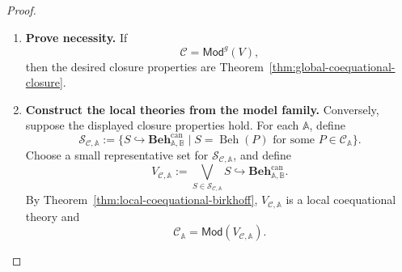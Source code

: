 \begin{proof}
    \leavevmode
    \begin{enumerate}
        \item \textbf{Prove necessity.}
        If
        \[
            \mathcal C=\mathsf{Mod}^{g}(V),
        \]
        then the desired closure properties are
        Theorem~\ref{thm:global-coequational-closure}.

        \item \textbf{Construct the local theories from the model family.}
        Conversely, suppose the displayed closure properties hold. For each
        \(\mathbb A\), define
        \[
            \mathcal S_{\mathcal C,\mathbb A}
            :=
            \{
                S\hookrightarrow
                \mathbf{Beh}^{\mathrm{can}}_{\mathbb A,\mathbb B}
                \mid
                S=\operatorname{Beh}(P)
                \text{ for some }P\in\mathcal C_{\mathbb A}
            \}.
        \]
        Choose a small representative set for
        \(\mathcal S_{\mathcal C,\mathbb A}\), and define
        \[
            V_{\mathcal C,\mathbb A}
            :=
            \bigvee_{S\in\mathcal S_{\mathcal C,\mathbb A}}
            S
            \hookrightarrow
            \mathbf{Beh}^{\mathrm{can}}_{\mathbb A,\mathbb B}.
        \]
        By Theorem~\ref{thm:local-coequational-birkhoff},
        \(V_{\mathcal C,\mathbb A}\) is a local coequational theory and
        \[
            \mathcal C_{\mathbb A}
            =
            \mathsf{Mod}(V_{\mathcal C,\mathbb A}).
        \]


\end{enumerate}
\end{proof}
